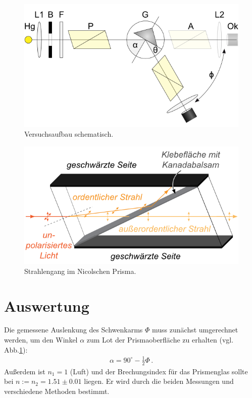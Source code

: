\documentclass[12pt,a4paper,titlepage,headinclude,bibtotoc]{scrartcl}
\begin{document}
\begin{figure}[!h]
	\centering
	\includegraphics[scale=0.7]{aufbau_schema.png}
	\caption{Versuchsaufbau schematisch. \cite[Datum: 23.03.2015]{LP20}}
	\label{fig:aufbau}
\end{figure}
\begin{figure}[!h]
	\centering
	\includegraphics[scale=0.7]{nicol.png}
	\caption{Strahlengang im Nicolschen Prisma. \cite[Datum: 23.03.2015]{LP20}}
	\label{fig:nicol}
\end{figure}

\section{Auswertung}
\label{sec:auswertung}
Die gemessene Auslenkung des Schwenkarms $\Phi$ muss zunächst umgerechnet werden, um den Winkel $\alpha$ zum Lot der Prismaoberfläche zu erhalten (vgl. Abb.\ref{fig:aufbau}):\\
\begin{align}
	\alpha=90^\circ-\frac{1}{2}\Phi\,.
\end{align}
Außerdem ist $n_1=1$ (Luft) und der Brechungsindex für das Prismenglas sollte bei $n := n_2=1.51 \pm 0.01$ liegen.
Er wird durch die beiden Messungen und verschiedene Methoden bestimmt.
\end{document}
